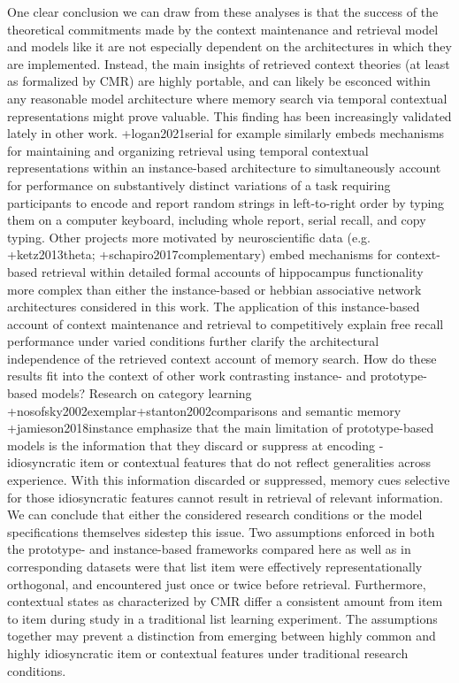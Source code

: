 One clear conclusion we can draw from these analyses is that the success of the theoretical commitments made by the context maintenance and retrieval model and models like it are not especially dependent on the architectures in which they are implemented. Instead, the main insights of retrieved context theories (at least as formalized by CMR) are highly portable, and can likely be esconced within any reasonable model architecture where memory search via temporal contextual representations might prove valuable. This finding has been increasingly validated lately in other work. +{}{}{logan2021serial} for example similarly embeds mechanisms for maintaining and organizing retrieval using temporal contextual representations within an instance-based architecture to simultaneously account for performance on substantively distinct variations of a task requiring participants to encode and report random strings in left-to-right order by typing them on a computer keyboard, including whole report, serial recall, and copy typing. Other projects more motivated by neuroscientific data (e.g. +{}{}{ketz2013theta}; +{}{}{schapiro2017complementary}) embed mechanisms for context-based retrieval within detailed formal accounts of hippocampus functionality more complex than either the instance-based or hebbian associative network architectures considered in this work. The application of this instance-based account of context maintenance and retrieval to competitively explain free recall performance under varied conditions further clarify the architectural independence of the retrieved context account of memory search.\markdownRendererInterblockSeparator
{}How do these results fit into the context of other work contrasting instance- and prototype-based models? Research on category learning +{}{}{nosofsky2002exemplar}+{}{}{stanton2002comparisons} and semantic memory +{}{}{jamieson2018instance} emphasize that the main limitation of prototype-based models is the information that they discard or suppress at encoding - idiosyncratic item or contextual features that do not reflect generalities across experience. With this information discarded or suppressed, memory cues selective for those idiosyncratic features cannot result in retrieval of relevant information. We can conclude that either the considered research conditions or the model specifications themselves sidestep this issue. Two assumptions enforced in both the prototype- and instance-based frameworks compared here as well as in corresponding datasets were that list item were effectively representationally orthogonal, and encountered just once or twice before retrieval. Furthermore, contextual states as characterized by CMR differ a consistent amount from item to item during study in a traditional list learning experiment. The assumptions together may prevent a distinction from emerging between highly common and highly idiosyncratic item or contextual features under traditional research conditions.\markdownRendererInterblockSeparator
